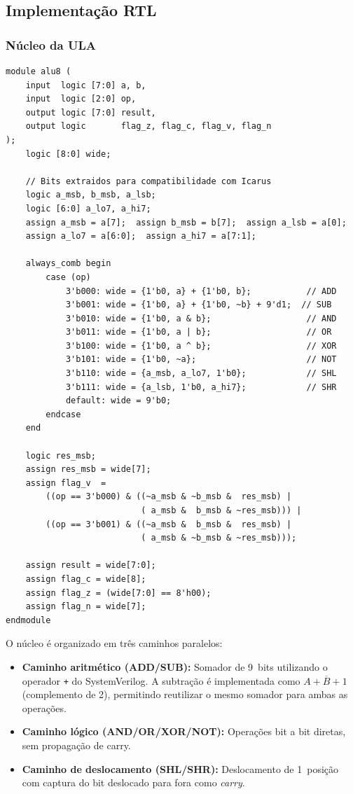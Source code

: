 \documentclass[12pt,a4paper]{article}
\begin{document}
\subsection{Implementação RTL}

\subsubsection{Núcleo da ULA}

\begin{lstlisting}[style=svstyle,caption={alu8.sv --- Núcleo combinacional da ULA de 8 bits},label=lst:alu]
module alu8 (
    input  logic [7:0] a, b,
    input  logic [2:0] op,
    output logic [7:0] result,
    output logic       flag_z, flag_c, flag_v, flag_n
);
    logic [8:0] wide;

    // Bits extraidos para compatibilidade com Icarus
    logic a_msb, b_msb, a_lsb;
    logic [6:0] a_lo7, a_hi7;
    assign a_msb = a[7];  assign b_msb = b[7];  assign a_lsb = a[0];
    assign a_lo7 = a[6:0];  assign a_hi7 = a[7:1];

    always_comb begin
        case (op)
            3'b000: wide = {1'b0, a} + {1'b0, b};           // ADD
            3'b001: wide = {1'b0, a} + {1'b0, ~b} + 9'd1;  // SUB
            3'b010: wide = {1'b0, a & b};                   // AND
            3'b011: wide = {1'b0, a | b};                   // OR
            3'b100: wide = {1'b0, a ^ b};                   // XOR
            3'b101: wide = {1'b0, ~a};                      // NOT
            3'b110: wide = {a_msb, a_lo7, 1'b0};            // SHL
            3'b111: wide = {a_lsb, 1'b0, a_hi7};            // SHR
            default: wide = 9'b0;
        endcase
    end

    logic res_msb;
    assign res_msb = wide[7];
    assign flag_v  =
        ((op == 3'b000) & ((~a_msb & ~b_msb &  res_msb) |
                           ( a_msb &  b_msb & ~res_msb))) |
        ((op == 3'b001) & ((~a_msb &  b_msb &  res_msb) |
                           ( a_msb & ~b_msb & ~res_msb)));

    assign result = wide[7:0];
    assign flag_c = wide[8];
    assign flag_z = (wide[7:0] == 8'h00);
    assign flag_n = wide[7];
endmodule
\end{lstlisting}

O núcleo é organizado em três caminhos paralelos:
\begin{itemize}[leftmargin=1.5em]
  \item \textbf{Caminho aritmético (ADD/SUB):} Somador de 9~bits utilizando o operador \texttt{+} do SystemVerilog. A subtração é implementada como $A + \overline{B} + 1$ (complemento de 2), permitindo reutilizar o mesmo somador para ambas as operações.
  \item \textbf{Caminho lógico (AND/OR/XOR/NOT):} Operações bit a bit diretas, sem propagação de carry.
  \item \textbf{Caminho de deslocamento (SHL/SHR):} Deslocamento de 1~posição com captura do bit deslocado para fora como \textit{carry}.
\end{itemize}
\end{document}
